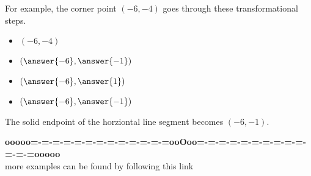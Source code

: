 \documentclass{ximera}
\begin{document}
\begin{procedure}
For example, the corner point $(-6, -4)$ goes through these transformational steps.

\begin{itemize}
\item $(-6, -4)$
\item $\left( \answer{-6},  \answer{-1} \right)$
\item $\left( \answer{-6},  \answer{1} \right)$
\item $\left( \answer{-6},  \answer{-1} \right)$
\end{itemize}

The solid endpoint of the horziontal line segment becomes $(-6, -1)$.
\end{procedure}












\begin{center}
\textbf{\textcolor{green!50!black}{ooooo=-=-=-=-=-=-=-=-=-=-=-=-=ooOoo=-=-=-=-=-=-=-=-=-=-=-=-=ooooo}} \\

more examples can be found by following this link\\ 

\end{center}
\end{document}
